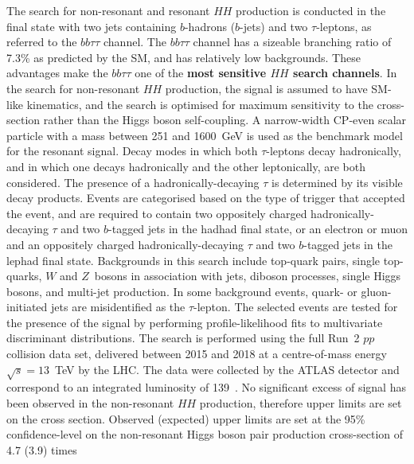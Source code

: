 \documentclass[twoside,11pt]{report}
\begin{document}
    The search for non-resonant and resonant $HH$ production is conducted
    in the final state with two jets containing $b$-hadrons ($b$-jets) and two $\tau$-leptons,
    as referred to the $bb\tau\tau$ channel. 
    The $bb\tau\tau$ channel has a sizeable branching ratio of 7.3\% as predicted by the SM, 
    and has relatively low backgrounds.
    These advantages make the $bb\tau\tau$ one of the \textbf{most sensitive $HH$ search channels}. 
    In the search for non-resonant $HH$ production, the signal is assumed to have SM-like kinematics, 
    and the search is optimised for maximum sensitivity to the 
    cross-section rather than the Higgs boson self-coupling. 
    A narrow-width CP-even scalar particle with a mass between 251 and 
    1600~GeV is used as the benchmark model for the resonant signal. 
    Decay modes in which both $\tau$-leptons decay hadronically, 
    and in which one decays hadronically and the other leptonically, 
    are both considered.
    The presence of a hadronically-decaying $\tau$ is determined by its
    visible decay products. 
    Events are categorised based on the type of trigger that accepted the event, 
    and are required to contain two oppositely charged hadronically-decaying $\tau$ 
    and two $b$-tagged jets in the hadhad final state, 
    or an electron or muon and an oppositely charged hadronically-decaying $\tau$ and 
    two $b$-tagged jets in the lephad final state. 
    Backgrounds in this search include top-quark pairs, single top-quarks, 
    $W$ and $Z$~bosons in association with jets, diboson processes, 
    single Higgs bosons, and multi-jet production. 
    In some background events, quark- or gluon-initiated jets are 
    misidentified as the $\tau$-lepton. 
    The selected events are tested for the presence of the signal 
    by performing profile-likelihood fits to multivariate discriminant distributions. 
    The search is performed using the full Run~2 $pp$ collision data set,
    delivered between 2015 and 2018 at a centre-of-mass energy $\sqrt{s}=13$~TeV by the LHC. 
    The data were collected by the ATLAS detector 
    and correspond to an integrated luminosity of 139~\ifb. 
    No significant excess of signal has been observed in the non-resonant $HH$ production,
    therefore upper limits are set on the cross section. 
    Observed (expected) upper limits are set at the 95\% confidence-level on the 
    non-resonant Higgs boson pair production cross-section of 4.7 (3.9) times 
\end{document}
